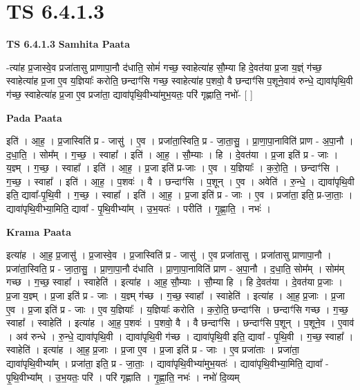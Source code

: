 \documentclass[17pt]{extarticle}
\begin{document}
\section{ TS 6.4.1.3 }

\textbf{TS 6.4.1.3 } \newline
\textbf{Samhita Paata} \newline

-त्या॑ह प्र॒जास्वे॒व प्रजा॑तासु प्राणापा॒नौ द॑धाति॒ सोमं॑ गच्छ॒ स्वाहेत्या॑ह सौ॒म्या हि दे॒वत॑या प्र॒जा य॒ज्ञ्ं ग॑च्छ॒ स्वाहेत्या॑ह प्र॒जा ए॒व य॒ज्ञियाः᳚ करोति॒ छन्दाꣳ॑सि गच्छ॒ स्वाहेत्या॑ह प॒शवो॒ वै छन्दाꣳ॑सि प॒शूने॒वाव॑ रुन्धे॒ द्यावा॑पृथि॒वी ग॑च्छ॒ स्वाहेत्या॑ह प्र॒जा ए॒व प्रजा॑ता॒ द्यावा॑पृथि॒वीभ्या॑मुभ॒यतः॒ परि॑ गृह्णाति॒ नभो॑- [  ] \newline

\textbf{Pada Paata} \newline

इति॑ । आ॒ह॒ । प्र॒जास्विति॑ प्र - जासु॑ । ए॒व । प्रजा॑ता॒स्विति॒ प्र - जा॒ता॒सु॒ । प्रा॒णा॒पा॒नाविति॑ प्राण - अ॒पा॒नौ । द॒धा॒ति॒ । सोम᳚म् । ग॒च्छ॒ । स्वाहा᳚ । इति॑ । आ॒ह॒ । सौ॒म्याः । हि । दे॒वत॑या । प्र॒जा इति॑ प्र - जाः । य॒ज्ञ्म् । ग॒च्छ॒ । स्वाहा᳚ । इति॑ । आ॒ह॒ । प्र॒जा इति॑ प्र-जाः । ए॒व । य॒ज्ञियाः᳚ । क॒रो॒ति॒ । छन्दाꣳ॑सि । ग॒च्छ॒ । स्वाहा᳚ । इति॑ । आ॒ह॒ । प॒शवः॑ । वै । छन्दाꣳ॑सि । प॒शून् । ए॒व । अवेति॑ । रु॒न्धे॒ । द्यावा॑पृथि॒वी इति॒ द्यावा᳚-पृ॒थि॒वी । ग॒च्छ॒ । स्वाहा᳚ । इति॑ । आ॒ह॒ । प्र॒जा इति॑ प्र - जाः । ए॒व । प्रजा॑ता॒ इति॒ प्र-जा॒ताः॒ । द्यावा॑पृथि॒वीभ्या॒मिति॒ द्यावा᳚ - पृ॒थि॒वीभ्या᳚म् । उ॒भ॒यतः॑ । परीति॑ । गृ॒ह्णा॒ति॒ । नभः॑ ।  \newline


\textbf{Krama Paata} \newline

इत्या॑ह । आ॒ह॒ प्र॒जासु॑ । प्र॒जास्वे॒व । प्र॒जास्विति॑ प्र - जासु॑ । ए॒व प्रजा॑तासु । प्रजा॑तासु प्राणापा॒नौ । प्रजा॑ता॒स्विति॒ प्र - जा॒ता॒सु॒ । प्रा॒णा॒पा॒नौ द॑धाति । प्रा॒णा॒पा॒नाविति॑ प्राण - अ॒पा॒नौ । द॒धा॒ति॒ सोम᳚म् । सोम॑म् गच्छ । ग॒च्छ॒ स्वाहा᳚ । स्वाहेति॑ । इत्या॑ह । आ॒ह॒ सौ॒म्याः । सौ॒म्या हि । हि दे॒वत॑या । दे॒वत॑या प्र॒जाः । प्र॒जा य॒ज्ञ्म् । प्र॒जा इति॑ प्र - जाः । य॒ज्ञ्म् ग॑च्छ । ग॒च्छ॒ स्वाहा᳚ । स्वाहेति॑ । इत्या॑ह । आ॒ह॒ प्र॒जाः । प्र॒जा ए॒व । प्र॒जा इति॑ प्र - जाः । ए॒व य॒ज्ञियाः᳚ । य॒ज्ञियाः᳚ करोति । क॒रो॒ति॒ छन्दाꣳ॑सि । छन्दाꣳ॑सि गच्छ । ग॒च्छ॒ स्वाहा᳚ । स्वाहेति॑ । इत्या॑ह । आ॒ह॒ प॒शवः॑ । प॒शवो॒ वै । वै छन्दाꣳ॑सि । छन्दाꣳ॑सि प॒शून् । प॒शूने॒व । ए॒वाव॑ । अव॑ रुन्धे । रु॒न्धे॒ द्यावा॑पृथि॒वी । द्यावा॑पृथि॒वी ग॑च्छ । द्यावा॑पृथि॒वी इति॒ द्यावा᳚ - पृ॒थि॒वी । ग॒च्छ॒ स्वाहा᳚ । स्वाहेति॑ । इत्या॑ह । आ॒ह॒ प्र॒जाः । प्र॒जा ए॒व । प्र॒जा इति॑ प्र - जाः । ए॒व प्रजा॑ताः । प्रजा॑ता॒ द्यावा॑पृथि॒वीभ्या᳚म् । प्रजा॑ता॒ इति॒ प्र - जा॒ताः॒ । द्यावा॑पृथि॒वीभ्या॑मुभ॒यतः॑ । द्यावा॑पृथि॒वीभ्या॒मिति॒ द्यावा᳚ - पृ॒थि॒वीभ्या᳚म् । उ॒भ॒यतः॒ परि॑ । परि॑ गृह्णाति । गृ॒ह्णा॒ति॒ नभः॑ । नभो॑ दि॒व्यम् \newline
\end{document}

